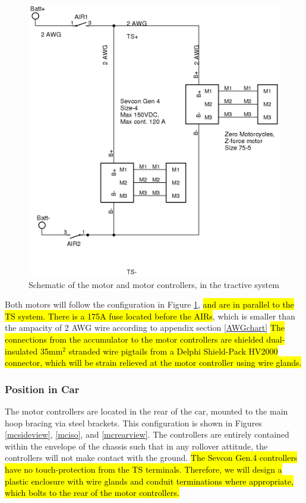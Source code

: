 \documentclass{article}
\DeclareRobustCommand{\hlr}[1]{{\sethlcolor{red}\hl{#1}}}
\begin{document}
            \begin{figure}[H]
                \centering
                \includegraphics[width = 0.75 \textwidth]{motorcontroller}
                \caption{Schematic of the motor and motor controllers, in the tractive system}
                \label{mcschem}
            \end{figure}


            Both motors will follow the configuration in Figure \ref{mcschem}, \hlr{and are in parallel to the TS system. There is a 175A fuse located before the AIRs}, which is smaller than the ampacity of 2 AWG wire according to appendix section \ref{AWGchart} \hlr{The connections from the accumulator to the motor controllers are shielded dual-insulated 35mm$^2$ stranded wire pigtails from a Delphi Shield-Pack HV2000 connector, which will be strain relieved at the motor controller using wire glands.}

        \subsubsection{Position in Car}

            The motor controllers are located in the rear of the car, mounted to the main hoop bracing via steel brackets. This configuration is shown in Figures \ref{mcsideview}, \ref{mciso}, and \ref{mcrearview}. The controllers are entirely contained within the envelope of the chassis such that in any rollover attitude, the controllers will not make contact with the ground. \hlr{The Sevcon Gen.4 controllers have no touch-protection from the TS terminals. Therefore, we will design a plastic enclosure with wire glands and conduit terminations where appropriate, which bolts to the rear of the motor controllers. }
\end{document}
